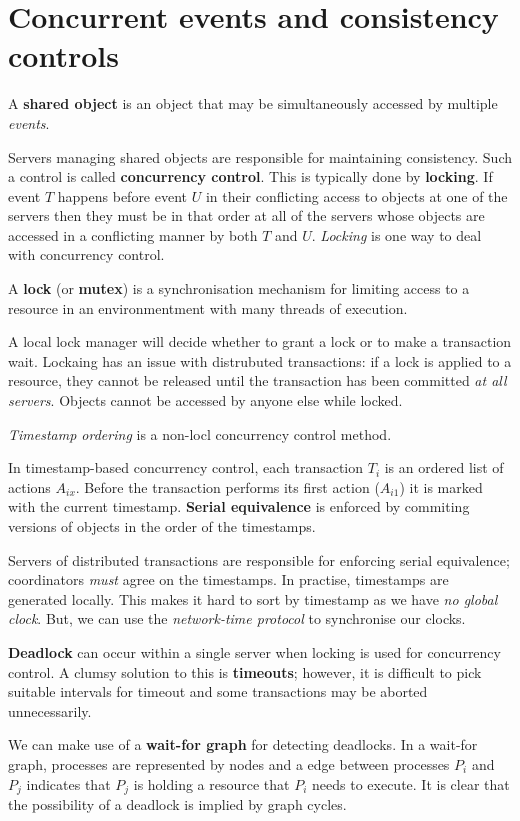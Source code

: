 \chapter{Concurrent events and consistency controls}

\begin{definition}
    A \textbf{shared object} is an object that may be simultaneously accessed by
    multiple \emph{events}.
\end{definition}

Servers managing shared objects are responsible for maintaining consistency.
Such a control is called \textbf{concurrency control}.
This is typically done by \textbf{locking}.
If event $T$ happens before event $U$ in their conflicting access to
objects at one of the servers then they must be in that order at all of the
servers whose objects are accessed in a conflicting manner by both $T$ and $U$.
\emph{Locking} is one way to deal with concurrency control.

\begin{definition}[Locking]
    A \textbf{lock} (or \textbf{mutex}) is a synchronisation mechanism for
    limiting access to a resource in an environmentment with many threads of execution.
\end{definition}

A local lock manager will decide whether to grant a lock or to make a transaction wait.
Lockaing has an issue with distrubuted transactions:
if a lock is applied to a resource, they cannot be released until the transaction
has been committed \emph{at all servers}.
Objects cannot be accessed by anyone else while locked.

\emph{Timestamp ordering} is a non-locl concurrency control method.
\begin{definition}
    In timestamp-based concurrency control,
    each transaction $T_i$ is an ordered list of actions $A_{ix}$.
    Before the transaction performs its first action ($A_{i1}$)
    it is marked with the current timestamp.
    \textbf{Serial equivalence} is enforced by commiting versions of objects
    in the order of the timestamps.
\end{definition}

Servers of distributed transactions are responsible for enforcing serial equivalence;
coordinators \emph{must} agree on the timestamps.
In practise, timestamps are generated locally.
This makes it hard to sort by timestamp as we have \emph{no global clock}.
But, we can use the \emph{network-time protocol} to synchronise our clocks.

\textbf{Deadlock} can occur within a single server when locking is used for concurrency control.
A clumsy solution to this is \textbf{timeouts}; however,
it is difficult to pick suitable intervals for timeout and some transactions may be
aborted unnecessarily.

We can make use of a \textbf{wait-for graph} for detecting deadlocks.
In a wait-for graph, processes are represented by nodes
and a edge between processes $P_i$ and $P_j$ indicates that
$P_j$ is holding a resource that $P_i$ needs to execute.
It is clear that the possibility of a deadlock is implied by graph cycles. 
